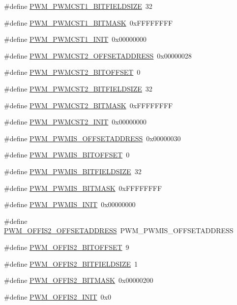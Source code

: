 \begin{DoxyCompactItemize}
\item 
\#define \hyperlink{a00565_aece3415a67ea87bc39a36d41a98777ca}{PWM\_\-PWMCST1\_\-BITFIELDSIZE}~32
\item 
\#define \hyperlink{a00565_a520f5915f13969709b5dd5b809ae0189}{PWM\_\-PWMCST1\_\-BITMASK}~0xFFFFFFFF
\item 
\#define \hyperlink{a00565_a507fa471c1eb1994c73ac92fed9f2f78}{PWM\_\-PWMCST1\_\-INIT}~0x00000000
\item 
\#define \hyperlink{a00565_a81bdbb774320c60d5ed169b4f5cb833d}{PWM\_\-PWMCST2\_\-OFFSETADDRESS}~0x00000028
\item 
\#define \hyperlink{a00565_a89186f7b73a1c8ae73069751717eaa4c}{PWM\_\-PWMCST2\_\-BITOFFSET}~0
\item 
\#define \hyperlink{a00565_ace5f322318efae3c8fdbc8140f82cdd3}{PWM\_\-PWMCST2\_\-BITFIELDSIZE}~32
\item 
\#define \hyperlink{a00565_aadf5c28e1c542f508c1997683c5f0179}{PWM\_\-PWMCST2\_\-BITMASK}~0xFFFFFFFF
\item 
\#define \hyperlink{a00565_ac7897dc0dc26dfd99dd2e6d8a07cdbd9}{PWM\_\-PWMCST2\_\-INIT}~0x00000000
\item 
\#define \hyperlink{a00565_ae8efb404ac600ed96a7e07f5827853a3}{PWM\_\-PWMIS\_\-OFFSETADDRESS}~0x00000030
\item 
\#define \hyperlink{a00565_aecc69ca8656aab951d4a6e4657b199f2}{PWM\_\-PWMIS\_\-BITOFFSET}~0
\item 
\#define \hyperlink{a00565_a9666d5eb40575f281c9569cf3dab969b}{PWM\_\-PWMIS\_\-BITFIELDSIZE}~32
\item 
\#define \hyperlink{a00565_ac3bcdcc018853a301f78c32671b9c81d}{PWM\_\-PWMIS\_\-BITMASK}~0xFFFFFFFF
\item 
\#define \hyperlink{a00565_abd79dfa7ccc23e9f10c6962a4da55800}{PWM\_\-PWMIS\_\-INIT}~0x00000000
\item 
\#define \hyperlink{a00565_a2e47de59f6ab527f42e6960c00488d3b}{PWM\_\-OFFIS2\_\-OFFSETADDRESS}~PWM\_\-PWMIS\_\-OFFSETADDRESS
\item 
\#define \hyperlink{a00565_aae57b43d574c920a6c5058652be7ccc2}{PWM\_\-OFFIS2\_\-BITOFFSET}~9
\item 
\#define \hyperlink{a00565_a602ec25550a607b94e516304074a697c}{PWM\_\-OFFIS2\_\-BITFIELDSIZE}~1
\item 
\#define \hyperlink{a00565_ab7c352d8d1e26c09c7c7f3fbf68c6e97}{PWM\_\-OFFIS2\_\-BITMASK}~0x00000200
\item 
\#define \hyperlink{a00565_a73ae00395d1cf4ed2ca2babab730d6ec}{PWM\_\-OFFIS2\_\-INIT}~0x0

\end{DoxyCompactItemize}
